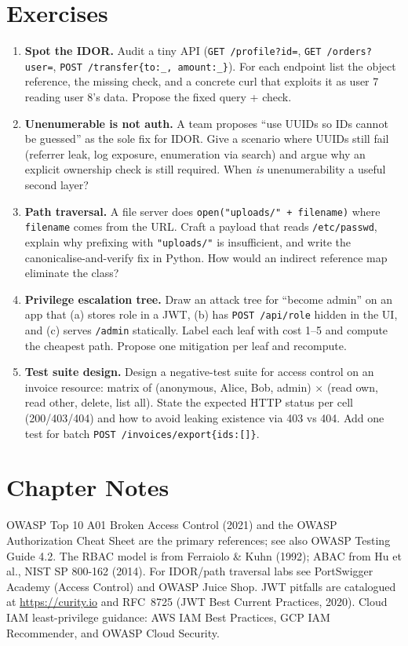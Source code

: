 \section{Exercises}\label{sec:ch04-exercises}
\begin{enumerate}[label=E4.\arabic*, leftmargin=*, itemsep=0.6em]
    \item \textbf{Spot the IDOR.} Audit a tiny API (\texttt{GET /profile?id=}, \texttt{GET /orders?user=}, \texttt{POST /transfer\{to:\_, amount:\_\}}). For each endpoint list the object reference, the missing check, and a concrete curl that exploits it as user 7 reading user 8's data. Propose the fixed query + check.
    \item \textbf{Unenumerable is not auth.} A team proposes ``use UUIDs so IDs cannot be guessed'' as the sole fix for IDOR. Give a scenario where UUIDs still fail (referrer leak, log exposure, enumeration via search) and argue why an explicit ownership check is still required. When \emph{is} unenumerability a useful second layer?
    \item \textbf{Path traversal.} A file server does \texttt{open("uploads/" + filename)} where \texttt{filename} comes from the URL. Craft a payload that reads \texttt{/etc/passwd}, explain why prefixing with \texttt{"uploads/"} is insufficient, and write the canonicalise-and-verify fix in Python. How would an indirect reference map eliminate the class?
    \item \textbf{Privilege escalation tree.} Draw an attack tree for ``become admin'' on an app that (a) stores role in a JWT, (b) has \texttt{POST /api/role} hidden in the UI, and (c) serves \texttt{/admin} statically. Label each leaf with cost 1--5 and compute the cheapest path. Propose one mitigation per leaf and recompute.
    \item \textbf{Test suite design.} Design a negative-test suite for access control on an invoice resource: matrix of (anonymous, Alice, Bob, admin) $\times$ (read own, read other, delete, list all). State the expected HTTP status per cell (200/403/404) and how to avoid leaking existence via 403 vs 404. Add one test for batch \texttt{POST /invoices/export\{ids:[]\}}.
\end{enumerate}

\section*{Chapter Notes}
OWASP Top 10 A01 Broken Access Control (2021) and the OWASP Authorization Cheat Sheet are the primary references; see also OWASP Testing Guide 4.2. The RBAC model is from Ferraiolo \& Kuhn (1992); ABAC from Hu et al., NIST SP 800-162 (2014). For IDOR/path traversal labs see PortSwigger Academy (Access Control) and OWASP Juice Shop. JWT pitfalls are catalogued at \url{https://curity.io} and RFC~8725 (JWT Best Current Practices, 2020). Cloud IAM least-privilege guidance: AWS IAM Best Practices, GCP IAM Recommender, and OWASP Cloud Security.

